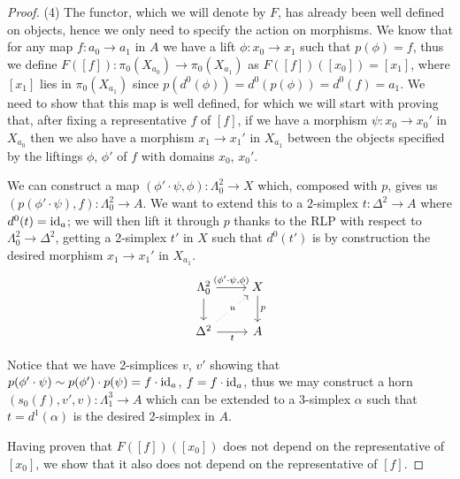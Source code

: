 \documentclass[a4paper,11pt,openany]{scrartcl}
\begin{document}
\begin{proof}
    (4) The functor, which we will denote by $F$, has already been well defined
    on objects, hence we only need to specify the action on morphisms. We know
    that for any map $f\colon a_0\rightarrow a_1$ in $A$ we have a lift
    $\phi\colon x_0\rightarrow x_1$ such that $p(\phi)=f$, thus we define
    $F([f])\colon\pi_0(X_{a_0})\rightarrow\pi_0(X_{a_1})$ as
    $F([f])([x_0])=[x_1]$, where $[x_1]$ lies in $\pi_0(X_{a_1})$ since
    $p(d^0(\phi))=d^0(p(\phi))=d^0(f)=a_1$.
    We need to show that this map is well defined, for which we will start with
    proving that, after fixing a representative $f$ of $[f]$, if we have a
    morphism $\psi\colon x_0\rightarrow x_0'$ in $X_{a_0}$ then we also have a
    morphism $x_1\rightarrow x_1'$ in $X_{a_1}$ between the objects specified by
    the liftings $\phi$, $\phi'$ of $f$ with domains $x_0$, $x_0'$.

    We can construct a map
    $(\phi'\cdot\psi,\phi)\colon\Lambda^2_0\rightarrow X$ which, composed
    with $p$, gives us $(p(\phi'\cdot\psi),f)\colon\Lambda^2_0\rightarrow A$. We
    want to extend this to a $2$-simplex $t\colon\Delta^2\rightarrow A$ where
    $d^0(t)=\operatorname{id}_a$; we will then lift it through $p$ thanks to the RLP with
    respect to $\Lambda^2_0\rightarrow\Delta^2$, getting a 2-simplex $t'$ in $X$
    such that $d^0(t')$ is by construction the desired morphism $x_1\rightarrow
    x_1'$ in $X_{a_1}$.
    \[\begin{tikzcd}
        {\Lambda^2_0} & X \\
        {\Delta^2} & A
        \arrow["{(\phi'\cdot\psi,\phi)}", from=1-1, to=1-2]
        \arrow["p", from=1-2, to=2-2]
        \arrow["t"', from=2-1, to=2-2]
        \arrow[from=1-1, to=2-1]
        \arrow["{u}"{description}, dotted, from=2-1, to=1-2]
    \end{tikzcd}\]

    Notice that we have 2-simplices $v$, $v'$ showing that
    $p(\phi'\cdot\psi)\sim p(\phi')\cdot p(\psi)=f\cdot\operatorname{id}_a$, $f=f\cdot\operatorname{id}_a$,
    thus we may construct a horn $(s_0(f),v',v)\colon\Lambda^3_1\rightarrow A$
    which can be extended to a 3-simplex $\alpha$ such that $t=d^1(\alpha)$ is
    the desired 2-simplex in $A$.

    Having proven that $F([f])([x_0])$ does not depend on the representative of
    $[x_0]$, we show that it also does not depend on the representative of
    $[f]$.


\end{proof}
\end{document}
